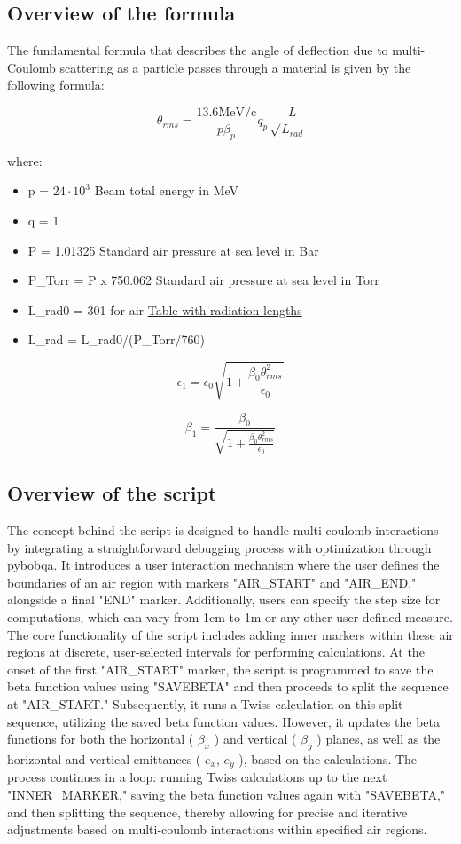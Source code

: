 \documentclass[a4paper,
               biblatex,     %
               ]{jacow}
\begin{document}
\subsection{Overview of the formula}

The fundamental formula that describes the angle of deflection due to multi-Coulomb scattering as a particle passes through a material is given by the following formula:

\[
\theta_{rms} = \frac{13.6 \text{MeV/c}}{p\beta_{p}}q_{p}\sqrt\frac{L}{L_{rad}}\]

where:
\begin{itemize}
\item p = $24\cdot 10^{3}$ Beam total energy in MeV
\item q = 1
\item P = 1.01325  Standard air pressure at sea level in Bar
\item P\_Torr = P x 750.062 Standard air pressure at sea level in Torr
\item L\_rad0 = 301 for air \href{https://cds.cern.ch/record/941314/files/p245.pdf}{Table with radiation lengths}
\item L\_rad = L\_rad0/(P\_Torr/760)
\end{itemize}

\[
\epsilon_{1} = \epsilon_{0}\sqrt{1+\frac{\beta_{0}\theta_{rms}^{2}}{\epsilon_{0}}}
\]

\[
\beta_{1}=\frac{\beta_{0}}{\sqrt{1+\frac{\beta_{0}\theta_{rms}^{2}}{\epsilon_{0}}}}
\]


\subsection{Overview of the script}

The concept behind the script is designed to handle multi-coulomb interactions by integrating a straightforward debugging process with optimization through pybobqa. It introduces a user interaction mechanism where the user defines the boundaries of an air region with markers "AIR\_START" and "AIR\_END," alongside a final "END" marker. Additionally, users can specify the step size for computations, which can vary from 1cm to 1m or any other user-defined measure. The core functionality of the script includes adding inner markers within these air regions at discrete, user-selected intervals for performing calculations. At the onset of the first "AIR\_START" marker, the script is programmed to save the beta function values using "SAVEBETA" and then proceeds to split the sequence at "AIR\_START." Subsequently, it runs a Twiss calculation on this split sequence, utilizing the saved beta function values. However, it updates the beta functions for both the horizontal ( $\beta_{x}$ ) and vertical ( $\beta_{y}$ ) planes, as well as the horizontal and vertical emittances ( $e_{x}$, $e_{y}$ ), based on the calculations. The process continues in a loop: running Twiss calculations up to the next "INNER\_MARKER," saving the beta function values again with "SAVEBETA," and then splitting the sequence, thereby allowing for precise and iterative adjustments based on multi-coulomb interactions within specified air regions.
\end{document}
